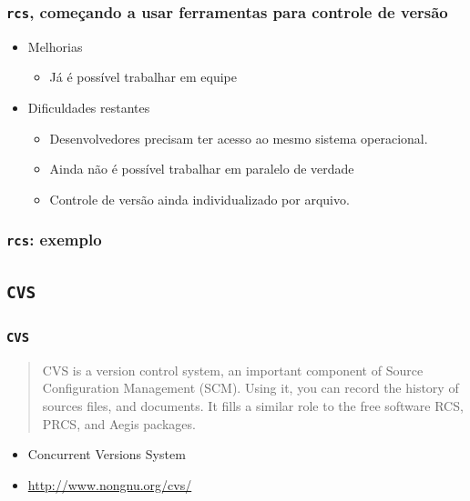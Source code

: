\documentclass{beamer}
\newcommand{\rcs}{\texttt{rcs}}
\newcommand{\cvs}{\texttt{CVS}}
\begin{document}
\begin{frame}
  \frametitle{\rcs, começando a usar ferramentas para controle de versão}
  \begin{itemize}
    \item Melhorias
      \begin{itemize}
        \item Já é possível trabalhar em equipe
      \end{itemize}
    \item Dificuldades restantes
      \begin{itemize}
        \item Desenvolvedores precisam ter acesso ao mesmo sistema
          operacional.
        \item Ainda não é possível trabalhar em paralelo de verdade
        \item Controle de versão ainda individualizado por arquivo.
      \end{itemize}
  \end{itemize}
\end{frame}

\begin{frame}
  \frametitle{\rcs: exemplo}
  \begin{figure}[h]
    \begin{center}
    \end{center}
    \label{fig:rcs}
  \end{figure}
\end{frame}


\subsection{\cvs}

\begin{frame}
  \frametitle{\cvs}
  \begin{quote}
    CVS is a version control system, an important component of Source
    Configuration Management (SCM). Using it, you can record the history
    of sources files, and documents. It fills a similar role to the free
    software RCS, PRCS, and Aegis packages.
  \end{quote}

  \begin{itemize}
    \item Concurrent Versions System
    \item \url{http://www.nongnu.org/cvs/}
  \end{itemize}
\end{frame}
\end{document}
